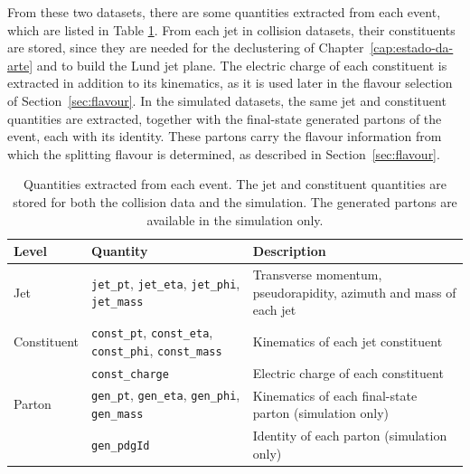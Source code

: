 From these two datasets, there are some quantities extracted from each event, which are listed in
Table \ref{tab:variables}. From each jet in collision datasets, their constituents
are stored, since they are needed for the declustering of Chapter~\ref{cap:estado-da-arte} and
to build the Lund jet plane. The electric charge of
each constituent is extracted in addition to its kinematics, as it is used later in
the flavour selection of Section~\ref{sec:flavour}. In the simulated datasets, the
same jet and constituent quantities are extracted, together with the final-state
generated partons of the event, each with its identity. These partons carry the
flavour information from which the splitting flavour is determined, as described in
Section~\ref{sec:flavour}.

\begin{table}[htbp]
  \centering
  \caption{Quantities extracted from each event. The jet and constituent
  quantities are stored for both the collision data and the simulation. The
  generated partons are available in the simulation only.}
  \label{tab:variables}
  \begin{tabularx}{\textwidth}{@{}llX@{}}
    \toprule
    Level & Quantity & Description \\
    \midrule
    Jet & \texttt{jet\_pt}, \texttt{jet\_eta}, \texttt{jet\_phi}, \texttt{jet\_mass}
        & Transverse momentum, pseudorapidity, azimuth and mass of each jet \\[6pt]
    \midrule
    Constituent & \texttt{const\_pt}, \texttt{const\_eta}, \texttt{const\_phi}, \texttt{const\_mass}
        & Kinematics of each jet constituent \\[2pt]
        & \texttt{const\_charge} & Electric charge of each constituent \\[6pt]
    \midrule
    Parton & \texttt{gen\_pt}, \texttt{gen\_eta}, \texttt{gen\_phi}, \texttt{gen\_mass}
        & Kinematics of each final-state parton (simulation only) \\[2pt]
        & \texttt{gen\_pdgId} & Identity of each parton (simulation only) \\
    \bottomrule
  \end{tabularx}
\end{table}

